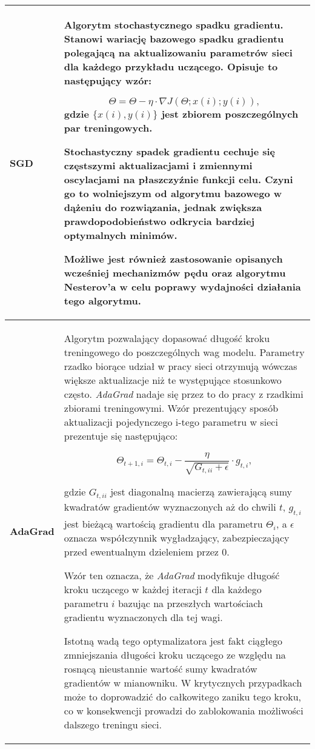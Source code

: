 \begin{enumerate}
\begin{small}
\begin{longtable}{ |m{3cm}|m{10cm}| }
     \hline
       \textbf{SGD \cite{SGD}} &

       Algorytm stochastycznego spadku gradientu. Stanowi wariację bazowego spadku
       gradientu polegającą na aktualizowaniu parametrów sieci dla
       każdego przykładu uczącego. Opisuje to następujący wzór:

       \[\Theta = \Theta - \eta \cdot \nabla J(\Theta;x(i);y(i)),\]
       gdzie $\{x(i), y(i)\}$ jest zbiorem poszczególnych par treningowych.

       Stochastyczny spadek gradientu cechuje się częstszymi aktualizacjami i
       zmiennymi oscylacjami na płaszczyźnie funkcji celu. Czyni go to wolniejszym od
       algorytmu bazowego w dążeniu do rozwiązania, jednak zwiększa prawdopodobieństwo odkrycia
       bardziej optymalnych minimów.

       Możliwe jest również zastosowanie opisanych wcześniej mechanizmów pędu oraz
       algorytmu Nesterov'a w celu poprawy wydajności działania tego algorytmu. \\

     \hline
       \textbf{AdaGrad \cite{Adagrad}} &

        Algorytm pozwalający dopasować długość kroku treningowego do poszczególnych
        wag modelu. Parametry rzadko biorące udział w pracy sieci otrzymują wówczas
        większe aktualizacje niż te występujące stosunkowo często. \textit{AdaGrad} nadaje się
        przez to do pracy z rzadkimi zbiorami treningowymi. Wzór prezentujący sposób aktualizacji
        pojedynczego i-tego parametru w sieci prezentuje się następująco:

        \[\Theta_{t+1,i} = \Theta_{t,i} - \frac{\eta}{\sqrt{G_{t,ii} + \epsilon}} \cdot g_{t,i},\]

        gdzie $G_{t,ii}$ jest diagonalną macierzą zawierającą sumy kwadratów gradientów
        wyznaczonych aż do chwili $t$, $g_{t,i}$ jest bieżącą wartością gradientu dla parametru $\Theta_i$, a
        $\epsilon$ oznacza współczynnik wygładzający, zabezpieczający przed ewentualnym dzieleniem
        przez 0.

        Wzór ten oznacza, że \textit{AdaGrad} modyfikuje długość kroku uczącego w każdej iteracji $t$
        dla każdego parametru $i$ bazując na przeszłych wartościach gradientu wyznaczonych
        dla tej wagi.

        Istotną wadą tego optymalizatora jest fakt ciągłego zmniejszania długości
        kroku uczącego ze względu na rosnącą nieustannie wartość sumy kwadratów
        gradientów w mianowniku. W krytycznych przypadkach może to doprowadzić
        do całkowitego zaniku tego kroku, co w konsekwencji prowadzi do
        zablokowania możliwości dalszego treningu sieci. \\


\end{longtable}
\end{small}
\end{enumerate}

